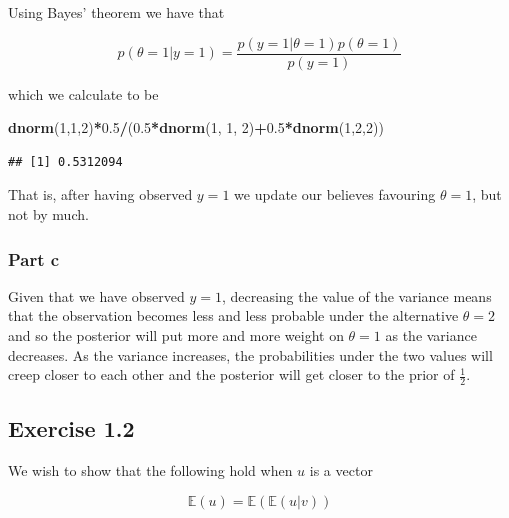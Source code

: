 \documentclass[]{article}
\newenvironment{Shaded}{\begin{snugshade}}{\end{snugshade}}
\newcommand{\KeywordTok}[1]{\textcolor[rgb]{0.13,0.29,0.53}{\textbf{#1}}}
\newcommand{\DecValTok}[1]{\textcolor[rgb]{0.00,0.00,0.81}{#1}}
\newcommand{\FloatTok}[1]{\textcolor[rgb]{0.00,0.00,0.81}{#1}}
\newcommand{\OperatorTok}[1]{\textcolor[rgb]{0.81,0.36,0.00}{\textbf{#1}}}
\newcommand{\NormalTok}[1]{#1}
\begin{document}
Using Bayes' theorem we have that

\[\begin{equation}
p(\theta=1|y=1) = \frac{p(y=1|\theta=1) p(\theta=1)}{p(y=1)}
\end{equation}\]

which we calculate to be

\begin{Shaded}
\begin{Highlighting}[]
\KeywordTok{dnorm}\NormalTok{(}\DecValTok{1}\NormalTok{,}\DecValTok{1}\NormalTok{,}\DecValTok{2}\NormalTok{)}\OperatorTok{*}\FloatTok{0.5}\OperatorTok{/}\NormalTok{(}\FloatTok{0.5}\OperatorTok{*}\KeywordTok{dnorm}\NormalTok{(}\DecValTok{1}\NormalTok{, }\DecValTok{1}\NormalTok{, }\DecValTok{2}\NormalTok{)}\OperatorTok{+}\FloatTok{0.5}\OperatorTok{*}\KeywordTok{dnorm}\NormalTok{(}\DecValTok{1}\NormalTok{,}\DecValTok{2}\NormalTok{,}\DecValTok{2}\NormalTok{))}
\end{Highlighting}
\end{Shaded}

\begin{verbatim}
## [1] 0.5312094
\end{verbatim}

That is, after having observed \(y=1\) we update our believes favouring
\(\theta=1\), but not by much.

\subsubsection{Part c}\label{part-c}

Given that we have observed \(y=1\), decreasing the value of the
variance means that the observation becomes less and less probable under
the alternative \(\theta=2\) and so the posterior will put more and more
weight on \(\theta=1\) as the variance decreases. As the variance
increases, the probabilities under the two values will creep closer to
each other and the posterior will get closer to the prior of
\(\frac{1}{2}\).

\subsection{Exercise 1.2}\label{exercise-1.2}

We wish to show that the following hold when \(u\) is a vector

\[\begin{equation}
\mathbb{E}(u) = \mathbb{E}(\mathbb{E}(u|v))
\end{equation}\]
\end{document}
